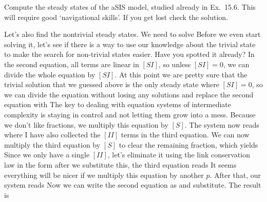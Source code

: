 Compute the steady states of the aSIS model, studied already in Ex.~15.6. This will require good `navigational skills'. If you get lost check the solution. 

\solution 
Let's also find the nontrivial steady states. We need to solve 
Before we even start solving it, let's see if there is a way to use our knowledge about the trivial state to make the search for non-trivial states easier. 
Have you spotted it already? In the second equation, all terms are linear in $[SI]$, so unless $[SI]=0$, we can divide the whole equation by $[SI]$. At this point we are pretty sure that the trivial solution that we guessed above is the only steady state where $[SI]=0$, so we can divide the equation without losing any solutions and replace the second equation with
The key to dealing with equation systems of intermediate complexity is staying in control and not letting them grow into a mess. Because we don't like fractions, we multiply this equation by $[S]$. The system now reads 
where I have also collected the $[II]$ terms in the third equation. We can now multiply the third equation by $[S]$ to clear the remaining fraction, which yields
Since we only have a single $[II]$, let's eliminate it using the link conservation law in the form 
after we substitute this, the third equation reads 
It seems everything will be nicer if we multiply this equation by another $p$. After that, our system reads
Now we can write the second equation as 
and substitute. The result is 
